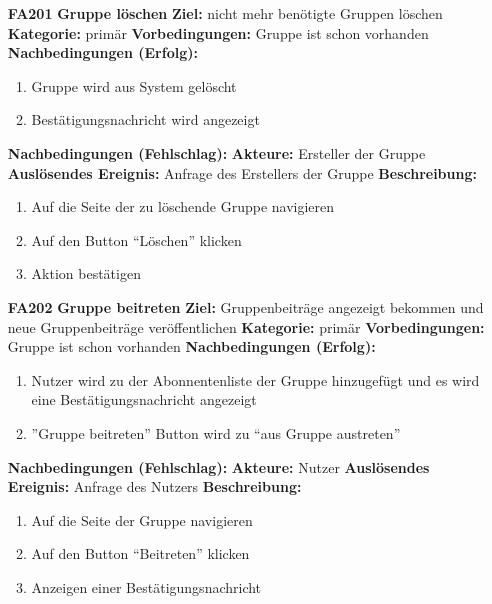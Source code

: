 \documentclass[parskip=full]{scrartcl}
\begin{document}
\begin{itemize}[nosep]
			\item[\textbf{FA201}]\textbf{Gruppe löschen}
						\newline \textbf{Ziel:} nicht mehr benötigte Gruppen löschen
						\newline \textbf{Kategorie:} primär
						\newline \textbf{Vorbedingungen:} Gruppe ist schon vorhanden
						\newline \textbf{Nachbedingungen (Erfolg):} 
						\begin{enumerate}[nosep]
							\item Gruppe wird aus System gelöscht
							\item Bestätigungsnachricht wird angezeigt
						\end{enumerate}
						\textbf{Nachbedingungen (Fehlschlag):}
						\newline \textbf{Akteure:} Ersteller der Gruppe
						\newline \textbf{Auslösendes Ereignis:} Anfrage des Erstellers der Gruppe
						\newline \textbf{Beschreibung:}
						\begin{enumerate}[nosep]
							\item Auf die Seite der zu löschende Gruppe navigieren
							\item Auf den Button “Löschen” klicken
							\item Aktion bestätigen\\
						\end{enumerate}
						
			\item[\textbf{FA202}]\textbf{Gruppe beitreten}
				\newline \textbf{Ziel:} Gruppenbeiträge angezeigt bekommen und neue Gruppenbeiträge veröffentlichen
				\newline \textbf{Kategorie:} primär
				\newline \textbf{Vorbedingungen:} Gruppe ist schon vorhanden
				\newline \textbf{Nachbedingungen (Erfolg):} 
					\begin{enumerate}[nosep]
						\item Nutzer wird zu der Abonnentenliste der Gruppe hinzugefügt und es wird eine Bestätigungsnachricht angezeigt
						\item ”Gruppe beitreten” Button wird zu “aus Gruppe austreten” 
					\end{enumerate}
				\textbf{Nachbedingungen (Fehlschlag):}
				\newline \textbf{Akteure:} Nutzer
				\newline \textbf{Auslösendes Ereignis:} Anfrage des Nutzers
				\newline \textbf{Beschreibung:}
					\begin{enumerate}[nosep]
						\item Auf die Seite der Gruppe navigieren
						\item Auf den Button “Beitreten” klicken
						\item Anzeigen einer Bestätigungsnachricht\\
					\end{enumerate}
									

\end{itemize}
\end{document}
